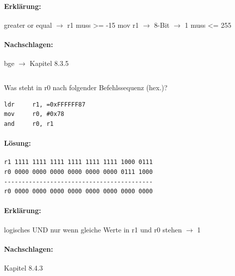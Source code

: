 \documentclass[12pt,twoside,a4paper]{article}
\begin{document}
\paragraph*{Erklärung:}
greater or equal $\rightarrow$ r1 muss >= -15 
mov r1 $\rightarrow$ 8-Bit $\rightarrow$ 1 muss <= 255

\paragraph*{Nachschlagen:}
bge $\rightarrow$ Kapitel 8.3.5

\subsection{}
Was steht in r0 nach folgender Befehlssequenz (hex.)?
\begin{lstlisting}
ldr		r1, =0xFFFFFF87
mov		r0, #0x78
and		r0, r1
\end{lstlisting}

\paragraph*{Lösung:}

\begin{lstlisting}
r1 1111 1111 1111 1111 1111 1111 1000 0111
r0 0000 0000 0000 0000 0000 0000 0111 1000
------------------------------------------
r0 0000 0000 0000 0000 0000 0000 0000 0000
\end{lstlisting}

\paragraph*{Erklärung:}
logisches UND nur wenn gleiche Werte in r1 und r0 stehen $\rightarrow$ 1

\paragraph*{Nachschlagen:}
Kapitel 8.4.3
\end{document}
